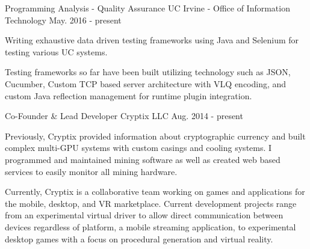 

\begin{cventries}

  \cventry
    {Programming Analysis - Quality Assurance} %
    {UC Irvine - Office of Information Technology} %
    {} %
    {May. 2016 - present} %
    {
      \begin{cvitems} %
        \item {Writing exhaustive data driven testing frameworks using Java and Selenium for testing various UC systems.}
        \item {Testing frameworks so far have been built utilizing technology such as JSON, Cucumber, Custom TCP based server architecture with VLQ encoding, and custom Java reflection management for runtime plugin integration.}
      \end{cvitems}
    }

  \cventry
    {Co-Founder \& Lead Developer} %
    {Cryptix LLC} %
    {} %
    {Aug. 2014 - present} %
    {
      \begin{cvitems} %
        \item {Previously, Cryptix provided information about cryptographic currency and built complex multi-GPU systems with custom casings and cooling systems. I programmed and maintained mining software as well as created web based services to easily monitor all mining hardware.}
        \item {Currently, Cryptix is a collaborative team working on games and applications for the mobile, desktop, and VR marketplace. Current development projects range from an experimental virtual driver to allow direct communication between devices regardless of platform, a mobile streaming application, to experimental desktop games with a focus on procedural generation and virtual reality.}
      \end{cvitems}
    }


\end{cventries}
